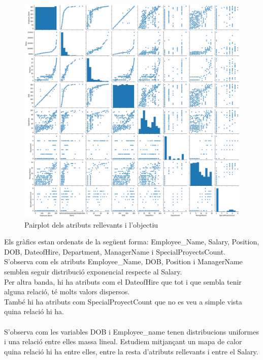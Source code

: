 \documentclass[a4paper, 11pt]{article}
\begin{document}
\begin{figure}[h]
 \centering
    \includegraphics[width=1\textwidth]{CORRELACIONS/grafics_correlacons.png}
    \caption{Pairplot dels atributs rellevants i l'objectiu}
    \label{pairplot}
\end{figure}
\hspace{-1.8 em}
Els gràfics estan ordenats de la següent forma: Employee\_Name, Salary, Position, DOB, DateofHire, Department, ManagerName i SpecialProyectsCount.\\
S'observa com els atributs Employee\_Name, DOB, Position i ManagerName semblen seguir distribució exponencial respecte al Salary.\\
Per altra banda, hi ha atributs com el DateofHire que tot i que sembla tenir alguna relació, té molts valors dispersos.\\
També hi ha atributs com SpecialProyectCount que no es veu a simple vista quina relació hi ha.\\
\\
S'observa com les variables DOB i Employee\_name tenen distribucions uniformes i una relació entre elles massa lineal. Estudiem mitjançant un mapa de calor quina relació hi ha entre elles, entre la resta d'atributs rellevants i entre el Salary.
\newpage 
\end{document}
